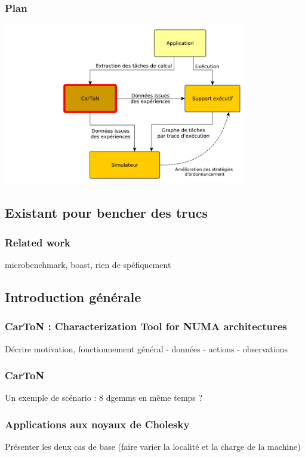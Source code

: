 \documentclass[xcolor={usenames,dvipsnames,svgnames,table}, aspectratio=43]{beamer}
\begin{document}
\begin{frame}
  \frametitle{Plan}
  \includegraphics[width=0.8\textwidth]{graph/big_picture-part1.pdf}
\end{frame}


\subsection*{Existant pour bencher des trucs}
\begin{frame}
\frametitle{Related work}

microbenchmark, boast, rien de spéfiquement

\end{frame}

\subsection*{Introduction générale}

\begin{frame}
  \frametitle{CarToN : Characterization Tool for NUMA architectures}

Décrire motivation, fonctionnement général
 - données
 - actions
 - observations

\end{frame}

\begin{frame}
\frametitle{CarToN}

Un exemple de scénario : 8 dgemms en même temps ?

\end{frame}

\begin{frame}
\frametitle{Applications aux noyaux de Cholesky}

Présenter les deux cas de base (faire varier la localité et la charge de la machine)

\end{frame}
\end{document}
